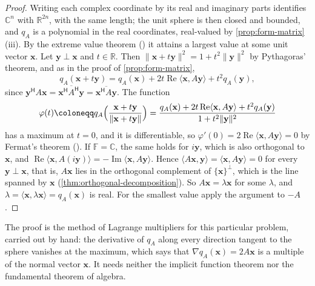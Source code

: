 \begin{proof}
Writing each complex coordinate by its real and imaginary parts identifies $\mathbb C^n$ with $\mathbb R^{2n}$, with the same length; the unit sphere is then closed and bounded, and $q_A$ is a polynomial in the real coordinates, real-valued by \cref{prop:form-matrix}\,(iii). By the extreme value theorem () it attains a largest value at some unit vector $\mathbf x$. Let $\mathbf y\perp\mathbf x$ and $t\in\mathbb R$. Then $\|\mathbf x+t\mathbf y\|^2=1+t^2\|\mathbf y\|^2$ by Pythagoras' theorem, and as in the proof of \cref{prop:form-matrix},
\[
q_A(\mathbf x+t\mathbf y)=q_A(\mathbf x)+2t\operatorname{Re}\langle\mathbf x,A\mathbf y\rangle+t^2q_A(\mathbf y),
\]
since $\mathbf y^{\mathsf H}A\mathbf x=\overline{\mathbf x^{\mathsf H}A^{\mathsf H}\mathbf y}=\overline{\mathbf x^{\mathsf H}A\mathbf y}$. The function
\[
\varphi(t)\coloneqq q_A\Bigl(\frac{\mathbf x+t\mathbf y}{\|\mathbf x+t\mathbf y\|}\Bigr)=\frac{q_A(\mathbf x)+2t\operatorname{Re}\langle\mathbf x,A\mathbf y\rangle+t^2q_A(\mathbf y)}{1+t^2\|\mathbf y\|^2}
\]
has a maximum at $t=0$, and it is differentiable, so $\varphi'(0)=2\operatorname{Re}\langle\mathbf x,A\mathbf y\rangle=0$ by Fermat's theorem (). If $\mathbb F=\mathbb C$, the same holds for $i\mathbf y$, which is also orthogonal to $\mathbf x$, and $\operatorname{Re}\langle\mathbf x,A(i\mathbf y)\rangle=-\operatorname{Im}\langle\mathbf x,A\mathbf y\rangle$. Hence $\langle A\mathbf x,\mathbf y\rangle=\langle\mathbf x,A\mathbf y\rangle=0$ for every $\mathbf y\perp\mathbf x$, that is, $A\mathbf x$ lies in the orthogonal complement of $\{\mathbf x\}^\perp$, which is the line spanned by $\mathbf x$ (\cref{thm:orthogonal-decomposition}). So $A\mathbf x=\lambda\mathbf x$ for some $\lambda$, and $\lambda=\langle\mathbf x,\lambda\mathbf x\rangle=q_A(\mathbf x)$ is real. For the smallest value apply the argument to $-A$.
\end{proof}

The proof is the method of Lagrange multipliers for this particular problem, carried out by hand: the derivative of $q_A$ along every direction tangent to the sphere vanishes at the maximum, which says that $\nabla q_A(\mathbf x)=2A\mathbf x$ is a multiple of the normal vector $\mathbf x$. It needs neither the implicit function theorem nor the fundamental theorem of algebra.

